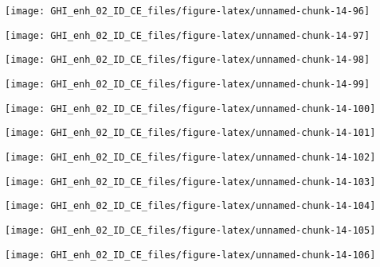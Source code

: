 \documentclass[
  10pt,
  a4paper,oneside]{article}
\begin{document}
\begin{center}\texttt{[image: GHI\_enh\_02\_ID\_CE\_files/figure-latex/unnamed-chunk-14-96]} \end{center}

\begin{center}\texttt{[image: GHI\_enh\_02\_ID\_CE\_files/figure-latex/unnamed-chunk-14-97]} \end{center}

\begin{center}\texttt{[image: GHI\_enh\_02\_ID\_CE\_files/figure-latex/unnamed-chunk-14-98]} \end{center}

\begin{center}\texttt{[image: GHI\_enh\_02\_ID\_CE\_files/figure-latex/unnamed-chunk-14-99]} \end{center}

\begin{center}\texttt{[image: GHI\_enh\_02\_ID\_CE\_files/figure-latex/unnamed-chunk-14-100]} \end{center}

\begin{center}\texttt{[image: GHI\_enh\_02\_ID\_CE\_files/figure-latex/unnamed-chunk-14-101]} \end{center}

\begin{center}\texttt{[image: GHI\_enh\_02\_ID\_CE\_files/figure-latex/unnamed-chunk-14-102]} \end{center}

\begin{center}\texttt{[image: GHI\_enh\_02\_ID\_CE\_files/figure-latex/unnamed-chunk-14-103]} \end{center}

\begin{center}\texttt{[image: GHI\_enh\_02\_ID\_CE\_files/figure-latex/unnamed-chunk-14-104]} \end{center}

\begin{center}\texttt{[image: GHI\_enh\_02\_ID\_CE\_files/figure-latex/unnamed-chunk-14-105]} \end{center}

\begin{center}\texttt{[image: GHI\_enh\_02\_ID\_CE\_files/figure-latex/unnamed-chunk-14-106]} \end{center}
\end{document}
